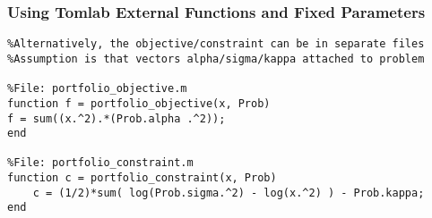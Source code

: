 \documentclass[nofootline]{etk-presentation}
\begin{document}
\begin{frame}[fragile]	\frametitle{Using Tomlab External Functions and Fixed Parameters}
	
\begin{verbatim}
%Alternatively, the objective/constraint can be in separate files
%Assumption is that vectors alpha/sigma/kappa attached to problem

%File: portfolio_objective.m
function f = portfolio_objective(x, Prob)
f = sum((x.^2).*(Prob.alpha .^2));
end

%File: portfolio_constraint.m
function c = portfolio_constraint(x, Prob)
	c = (1/2)*sum( log(Prob.sigma.^2) - log(x.^2) ) - Prob.kappa;
end
\end{verbatim}	
\end{frame}	
\end{document}
